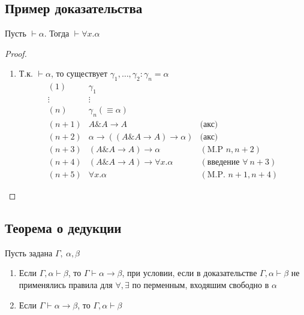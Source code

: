 \documentclass[oneside]{book}
\begin{document}
\subsection{Пример доказательства}
\label{sec:org2e531b6}
\begin{lemma}
	Пусть \(\vdash \alpha\). Тогда \(\vdash \forall x. \alpha\)
\end{lemma}
\begin{proof}
	\-
	\begin{enumerate}
		\item Т.к. \(\vdash \alpha\), то существует \(\gamma_1, \dots, \gamma_2: \gamma_n = \alpha\)
		      \[ \begin{matrix}
				      (1)     & \gamma_1                               &                                  \\
				      \vdots  & \vdots                                 &                                  \\
				      (n)     & \gamma_n (\equiv \alpha)               &                                  \\
				      (n + 1) & A\& A \to A                            & \text{(акс)}                     \\
				      (n + 2) & \alpha \to ((A \& A \to A) \to \alpha) & \text{(акс)}                     \\
				      (n + 3) & (A \& A \to A) \to \alpha              & (\text{M.P } n, n + 2)           \\
				      (n + 4) & (A \& A \to A) \to \forall x.\alpha    & (\text{введение }\forall\ n + 3) \\
				      (n + 5) & \forall x. \alpha                      & (\text{M.P. } n + 1, n + 4)
			      \end{matrix} \]
	\end{enumerate}
\end{proof}
\subsection{Теорема о дедукции}
\label{sec:orga1a09f9}
\begin{theorem}
	Пусть задана \(\Gamma,\ \alpha,\beta\)
	\begin{enumerate}
		\item Если \(\Gamma, \alpha \vdash \beta\), то \(\Gamma \vdash \alpha \to \beta\), при условии, если в доказательстве \(\Gamma, \alpha \vdash \beta\) не применялись правила для \(\forall, \exists\) по перменным, входяшим свободно в \(\alpha\)
		\item Если \(\Gamma \vdash \alpha \to \beta\), то \(\Gamma, \alpha \vdash \beta\)
	\end{enumerate}
	\label{org5ac1995}
\end{theorem}
\end{document}
